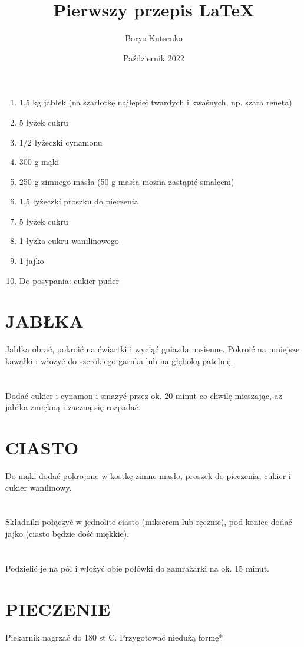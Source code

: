 \documentclass[12pt, letterpaper, titlepage]{article}
\title{Pierwszy przepis LaTeX}
\author{Borys Kutsenko}
\date{Październik 2022}
\begin{document}
\maketitle
\begin{enumerate}
\item 1,5 kg jabłek (na szarlotkę najlepiej twardych i kwaśnych, np. szara reneta)
\item 5 łyżek cukru 
\item 1/2 łyżeczki cynamonu
\item 300 g mąki
\item 250 g zimnego masła (50 g masła można zastąpić smalcem)
\item 1,5 łyżeczki proszku do pieczenia
\item 5 łyżek cukru
\item 1 łyżka cukru wanilinowego
\item 1 jajko
\item Do posypania: cukier puder
\end{enumerate}


\newpage

\section{JABŁKA}
Jabłka obrać, pokroić na ćwiartki i wyciąć gniazda nasienne. Pokroić na mniejsze kawałki i włożyć do szerokiego garnka lub na głęboką patelnię.
\section{}
Dodać cukier i cynamon i smażyć przez ok. 20 minut co chwilę mieszając, aż jabłka zmiękną i zaczną się rozpadać.
\section{CIASTO}
Do mąki dodać pokrojone w kostkę zimne masło, proszek do pieczenia, cukier i cukier wanilinowy.
\section{}
Składniki połączyć w jednolite ciasto (mikserem lub ręcznie), pod koniec dodać jajko (ciasto będzie dość miękkie).
\section{}
Podzielić je na pół i włożyć obie połówki do zamrażarki na ok. 15 minut.
\section{PIECZENIE}
Piekarnik nagrzać do 180 st C. Przygotować niedużą formę*
\end{document}
